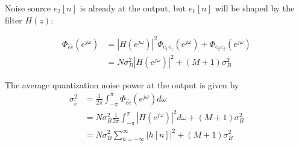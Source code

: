 \documentclass[10pt, handout]{beamer}
\begin{document}
\begin{frame}

Noise source $e_2[n]$ is already at the output, but $e_1[n]$ will be shaped by the filter $H(z)$:

\begin{align*}
\Phi_{\tilde{e}\tilde{e}}(e^{j\omega}) &= |H(e^{j\omega})|^2\Phi_{e_1e_1}(e^{j\omega}) +  \Phi_{e_2e_2}(e^{j\omega})\\
& = N\sigma_{B}^2|H(e^{j\omega})|^2 + (M+1)\sigma_{B}^2
\end{align*}

The average quantization noise power at the output is given by
\begin{align*}
\sigma_{\tilde{e}}^2 & =\frac{1}{2\pi}\int_{-\pi}^{\pi}\Phi_{\tilde{e}\tilde{e}}(e^{j\omega})d\omega \\
&= N\sigma_{B}^2\frac{1}{2\pi}\int_{-\pi}^{\pi} |H(e^{j\omega})|^2d\omega + (M+1)\sigma_{B}^2 \\
&= N\sigma_{B}^2\sum_{n=-\infty}^{\infty}|h[n]|^2 + (M+1)\sigma_{B}^2
\end{align*}

\end{frame}
\end{document}
